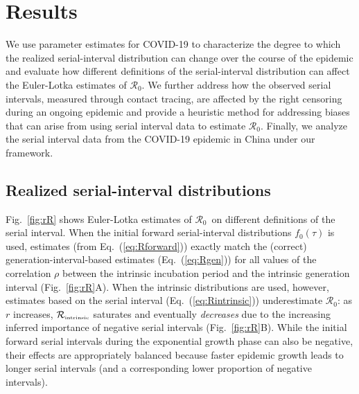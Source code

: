 \documentclass[12pt]{article}
\newcommand{\eref}[1]{Eq.~(\ref{eq:#1})}
\newcommand{\fref}[1]{Fig.~\ref{fig:#1}}
\newcommand{\Rx}[1]{\ensuremath{{\mathcal R}_{#1}}\xspace}
\newcommand{\Ro}{\Rx{0}}
\newcommand{\Rintrinsic}{\ensuremath{{\mathcal R}_{\textrm{\tiny intrinsic}}}\xspace}
\begin{document}
\section{Results}

We use parameter estimates for COVID-19 to characterize the degree to which the realized serial-interval distribution can change over the course of the epidemic and evaluate how different definitions of the serial-interval distribution can affect the Euler-Lotka estimates of \Ro.
We further address how the observed serial intervals, measured through contact tracing, are affected by the right censoring during an ongoing epidemic and provide a heuristic method for addressing biases that can arise from using serial interval data to estimate \Ro.
Finally, we analyze the serial interval data from the COVID-19 epidemic in China under our framework.

\subsection{Realized serial-interval distributions}

\fref{rR} shows Euler-Lotka estimates of \Ro\ on different definitions of the serial interval. 
When the initial forward serial-interval distributions $f_0(\tau)$ is used, estimates (from \eref{Rforward}) exactly match the (correct) generation-interval-based estimates (\eref{Rgen}) for all values of the correlation $\rho$ between the intrinsic incubation period and the intrinsic generation interval (\fref{rR}A).
When the intrinsic distributions are used, however, estimates based on the serial interval (\eref{Rintrinsic}) underestimate \Ro: as $r$ increases, \Rintrinsic saturates and eventually \emph{decreases} due to the increasing inferred importance of negative serial intervals (\fref{rR}B).
While the initial forward serial intervals during the exponential growth phase can also be negative, their effects are appropriately balanced because faster epidemic growth leads to longer serial intervals (and a corresponding lower proportion of negative intervals).
\end{document}

